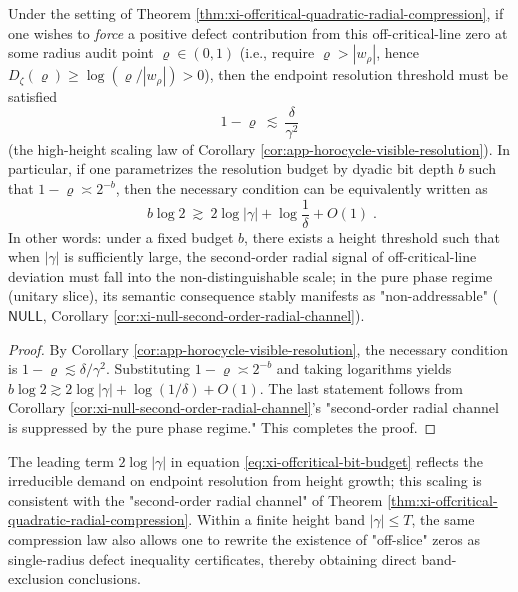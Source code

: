 \label{subsec:xi-certificate-coherence-orthogonal-axis-capacity-part3}

\begin{corollary}\label{cor:xi-offcritical-visibility-threshold-bit-budget}
Under the setting of Theorem \ref{thm:xi-offcritical-quadratic-radial-compression},
if one wishes to \emph{force} a positive defect contribution from this off-critical-line zero at some radius audit point \(\varrho\in(0,1)\) (i.e., require \(\varrho>|w_\rho|\), hence \(D_\zeta(\varrho)\ge \log(\varrho/|w_\rho|)>0\)),
then the endpoint resolution threshold must be satisfied
\[
1-\varrho\ \lesssim\ \frac{\delta}{\gamma^2}
\]
(the high-height scaling law of Corollary \ref{cor:app-horocycle-visible-resolution}).
In particular, if one parametrizes the resolution budget by dyadic bit depth \(b\) such that
\(
1-\varrho\asymp 2^{-b}
\),
then the necessary condition can be equivalently written as
\begin{equation}\label{eq:xi-offcritical-bit-budget}
\boxed{\;
b\log 2\ \gtrsim\ 2\log|\gamma|+\log\frac{1}{\delta}+O(1)\; }.
\end{equation}
In other words: under a fixed budget \(b\), there exists a height threshold such that when \(|\gamma|\) is sufficiently large, the second-order radial signal of off-critical-line deviation must fall into the non-distinguishable scale;
in the pure phase regime (unitary slice), its semantic consequence stably manifests as "non-addressable" (\(\mathsf{NULL}\), Corollary \ref{cor:xi-null-second-order-radial-channel}).
\end{corollary}

\begin{proof}
By Corollary \ref{cor:app-horocycle-visible-resolution}, the necessary condition is \(1-\varrho\lesssim \delta/\gamma^2\).
Substituting \(1-\varrho\asymp 2^{-b}\) and taking logarithms yields
\(
b\log 2\gtrsim 2\log|\gamma|+\log(1/\delta)+O(1)
\).
The last statement follows from Corollary \ref{cor:xi-null-second-order-radial-channel}'s "second-order radial channel is suppressed by the pure phase regime." This completes the proof.
\end{proof}

The leading term \(2\log|\gamma|\) in equation \eqref{eq:xi-offcritical-bit-budget} reflects the irreducible demand on endpoint resolution from height growth;
this scaling is consistent with the "second-order radial channel" of Theorem \ref{thm:xi-offcritical-quadratic-radial-compression}.
Within a finite height band \(|\gamma|\le T\), the same compression law also allows one to rewrite the existence of "off-slice" zeros as single-radius defect inequality certificates, thereby obtaining direct band-exclusion conclusions.

